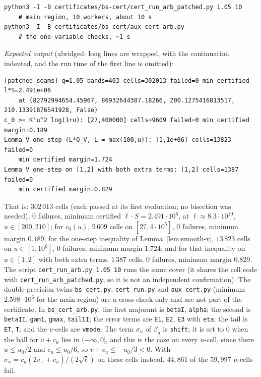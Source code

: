 \begin{verbatim}
python3 -I -B certificates/bs-cert/cert_run_arb_patched.py 1.05 10
    # main region, 10 workers, about 10 s
python3 -I -B certificates/bs-cert/aux_cert_arb.py
    # the one-variable checks, ~1 s
\end{verbatim}
\endgroup
\emph{Expected output} (abridged: long lines are wrapped, with the continuation indented, and the run time of the first line is
omitted):
\begingroup\footnotesize
\begin{verbatim}
[patched seams] q=1.05 bands=403 cells=302013 failed=0 min certified l*S=2.491e+06
    at (82792994654.45967, 86932644387.18266, 200.1275416813517, 210.13391876541928, False)
c_0 >= K'u^2 log(1+u): [27,400000] cells=9609 failed=0 min certified margin=0.189
Lemma V one-step (L*Q_V, L = max(100,u)): [1,1e+06] cells=13823 failed=0
    min certified margin=1.724
Lemma V one-step on [1,2] with both extra terms: [1,2] cells=1387 failed=0
    min certified margin=0.829
\end{verbatim}
\endgroup
That is: $302\,013$ cells (each passed at its first evaluation; no bisection was needed), $0$ failures, minimum certified $\ell\cdot S=2.491\cdot10^6$, at
$\ell\approx8.3\cdot10^{10}$, $u\in[200,210]$; for $c_0(u)$, $9\,609$ cells on $[27,4\cdot10^5]$, $0$ failures, minimum margin $0.189$;
for the one-step inequality of Lemma~\ref{lem:smooth-v}, $13\,823$ cells on $u\in[1,10^6]$, $0$ failures, minimum margin $1.724$;
and for that inequality on $u\in[1,2]$ with both extra terms, $1\,387$ cells, $0$ failures, minimum margin $0.829$. The script \texttt{cert\_run\_arb.py 1.05 10} runs the same cover
(it shares the cell code with \texttt{cert\_run\_arb\_patched.py}, so it is not an independent confirmation). The double-precision twins \texttt{bs\_cert.py}, \texttt{cert\_run.py} and \texttt{aux\_cert.py} (minimum $2.598\cdot10^6$ for
the main region) are a cross-check only and are not part of the certificate. In \texttt{bs\_cert\_arb.py}, the first majorant is \texttt{betaI},
\texttt{alpha}; the second is \texttt{betaII}, \texttt{gam1}, \texttt{gmax}, \texttt{tailII}; the error terms are \texttt{E1},
\texttt{E2}, \texttt{E3} with \texttt{eta}; the tail is \texttt{ET}, \texttt{T}; and the $v$-cells are \texttt{vmode}.
The term $\sigma_u$ of $\beta_a$ is \texttt{shift}; it is set to $0$ when the ball for $v+c_u$ lies in $(-\infty,0]$, and this is the case on
every $u$-cell, since there $u\le u_0/2$ and $c_u\le u_0/6$, so $v+c_u\le-u_0/3<0$. With $\sigma_u=c_u(2v_++c_u)/(2\sqrt\ell)$ on these
cells instead, $44{,}861$ of the $59{,}997$ $u$-cells fail.

